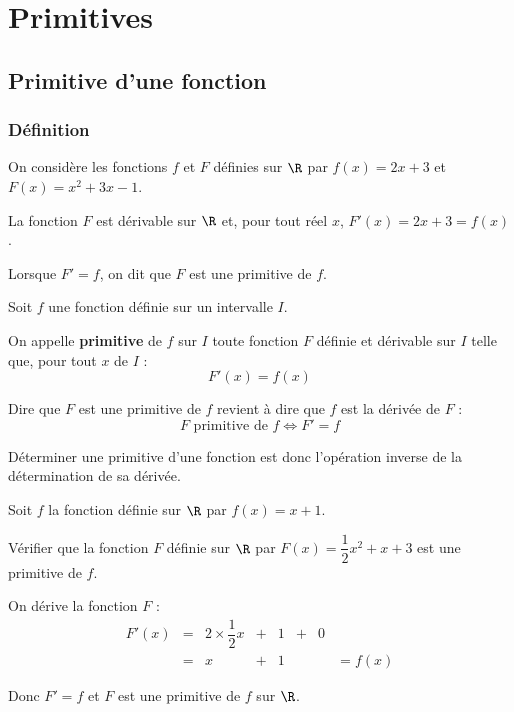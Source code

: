 \chapter{Primitives}

\section{Primitive d'une fonction}

\subsection{Définition}

\begin{ex}
	On considère les fonctions $f$ et $F$ définies sur $\R$ par $f(x) = 2x + 3$ et $F(x) = x^2 + 3x - 1$.

	La fonction $F$ est dérivable sur $\R$ et, pour tout réel $x$, $F'(x) = 2x + 3 = f(x)$.

	Lorsque $F' = f$, on dit que $F$ est une primitive de $f$.
\end{ex}

\begin{defin}
	Soit $f$ une fonction définie sur un intervalle $I$.

	On appelle \textbf{primitive} de $f$ sur $I$ toute fonction $F$ définie et dérivable sur $I$ telle que, pour tout $x$ de $I$ :
	\[
		F'(x) = f(x)
	\]
\end{defin}

\begin{rem}
	Dire que \og $F$ est une primitive de $f$\fg{} revient à dire que \og $f$ est la dérivée de $F$\fg{} :
	\[
		F \text{ primitive de } f \iff F' = f
	\]

	Déterminer une primitive d'une fonction est donc l'opération \og inverse\fg{} de la détermination de sa dérivée.

\end{rem}

\begin{methode}
	Soit $f$ la fonction définie sur $\R$ par $f(x) = x + 1$.

	Vérifier que la fonction $F$ définie sur $\R$ par $F(x) = \dfrac{1}{2}x^2 + x + 3$ est une primitive de $f$.

	\begin{correction}
		On dérive la fonction $F$ :
		\[
			\begin{array}{rccccccl}
				F'(x) & = & 2 \times \dfrac{1}{2}x & + & 1 & + & 0 &        \\
				      & = & x                      & + & 1 &   &   & = f(x)
			\end{array}
		\]

		Donc $F' = f$ et $F$ est une primitive de $f$ sur $\R$.
	\end{correction}
\end{methode}

